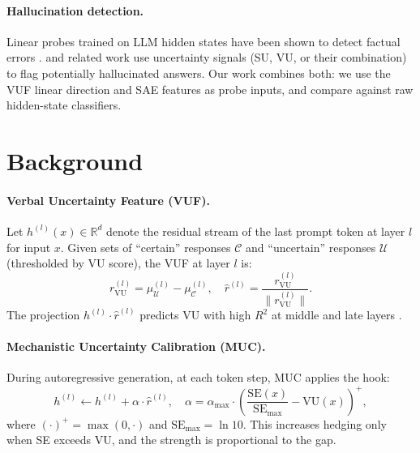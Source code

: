 \documentclass{article}
\newcommand{\VU}{\mathrm{VU}}
\newcommand{\SE}{\mathrm{SE}}
\newcommand{\rVU}{r_{\VU}}
\begin{document}
\paragraph{Hallucination detection.}
Linear probes trained on LLM hidden states have been shown to detect
factual errors \citep{azaria2023internal}.
\citet{slobodkin2023controlled} and related work use uncertainty
signals (SU, VU, or their combination) to flag potentially hallucinated answers.
Our work combines both: we use the VUF linear direction and SAE features as
probe inputs, and compare against raw hidden-state classifiers.

\section{Background}
\label{sec:background}

\paragraph{Verbal Uncertainty Feature (VUF).}
Let $h^{(l)}(x) \in \mathbb{R}^{d}$ denote the residual stream of the last
prompt token at layer $l$ for input $x$.  Given sets of ``certain'' responses
$\mathcal{C}$ and ``uncertain'' responses $\mathcal{U}$ (thresholded by VU
score), the VUF at layer $l$ is:
\begin{equation}
  \rVU^{(l)} = \mu_{\mathcal{U}}^{(l)} - \mu_{\mathcal{C}}^{(l)},
  \quad
  \hat{r}^{(l)} = \frac{\rVU^{(l)}}{\|\rVU^{(l)}\|}.
  \label{eq:vuf}
\end{equation}
The projection $h^{(l)} \cdot \hat{r}^{(l)}$ predicts VU with high $R^2$ at
middle and late layers \citep{kossen2024vcal}.

\paragraph{Mechanistic Uncertainty Calibration (MUC).}
During autoregressive generation, at each token step, MUC applies the hook:
\begin{equation}
  h^{(l)} \leftarrow h^{(l)} + \alpha \cdot \hat{r}^{(l)},
  \quad
  \alpha = \alpha_{\max} \cdot \left(\frac{\SE(x)}{\SE_{\max}} - \VU(x)\right)^{+},
  \label{eq:muc}
\end{equation}
where $(\cdot)^{+} = \max(0, \cdot)$ and $\SE_{\max} = \ln 10$.  This
increases hedging only when SE exceeds VU, and the strength is proportional to
the gap.
\end{document}
